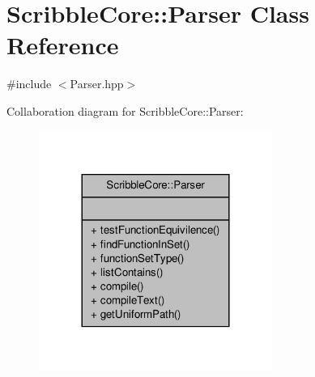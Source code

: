 \hypertarget{class_scribble_core_1_1_parser}{\section{Scribble\-Core\-:\-:Parser Class Reference}
\label{class_scribble_core_1_1_parser}
}


{\ttfamily \#include $<$Parser.\-hpp$>$}



Collaboration diagram for Scribble\-Core\-:\-:Parser\-:
\nopagebreak
\begin{figure}[H]
\begin{center}
\leavevmode
\includegraphics[width=216pt]{class_scribble_core_1_1_parser__coll__graph}
\end{center}
\end{figure}
